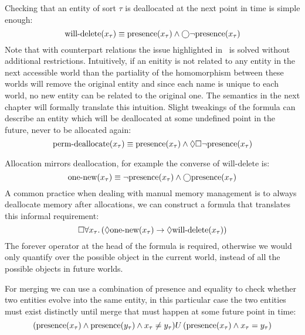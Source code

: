 \begin{example}[Deallocation]
  Checking that an entity of sort $\tau$ is deallocated at the next point in time is simple enough:
  \[\text{will-delete}(x_\tau) \equiv \text{presence}(x_\tau) \land \bigcirc{\neg\text{presence}(x_\tau)}\] Note that with
  counterpart relations the issue highlighted in~ is solved without additional restrictions.
  Intuitively, if an enitity is not related to any entity in the next accessible world than the partiality of the
  homomorphism between these worlds will remove the original entity and since each name is unique to each world, no new
  entity can be related to the original one. The semantics in the next chapter will formally translate this intuition.
  Slight tweakings of the formula can describe an entity which will be deallocated at some undefined point in the
  future, never to be allocated again: \[\text{perm-deallocate}(x_\tau) \equiv \text{presence}(x_\tau) \land
  \Diamond{\Box{\neg\text{presence}(x_\tau)}}\]
\end{example}
\begin{example}[Allocation]
  Allocation mirrors deallocation, for example the converse of $\text{will-delete}$ is: \[\text{one-new}(x_\tau) \equiv
  \neg\text{presence}(x_\tau) \land \bigcirc{\text{presence}(x_\tau)}\] A common practice when dealing with manual memory management
  is to always deallocate memory after allocations, we can construct a formula that translates this informal
  requirement: \[\Box{\forall {x_\tau} \ldotp {(\Diamond{\text{one-new}(x_\tau)} \to
  \Diamond{\text{will-delete}(x_\tau)})}}\] The forever operator at the head of the formula is required, otherwise we
  would only quantify over the possible object in the current world, instead of all the possible objects in future
  worlds.
\end{example}
\begin{example}[Merge]
  For merging we can use a combination of $\text{presence}$ and equality to check whether two entities evolve into the
  same entity, in this particular case the two entities must exist distinctly until merge that must happen at some
  future point in time:
  \[
    {(\text{presence}(x_\tau) \land
  \text{presence}(y_\tau) \land x_\tau \neq y_\tau)}U\,{(\text{presence}(x_\tau) \land x_\tau
  = y_\tau)}\]
\end{example}
